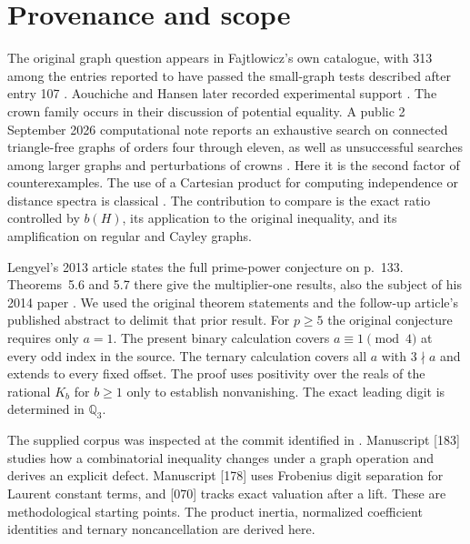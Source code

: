 \documentclass[11pt,a4paper]{article}
\begin{document}
\section{Provenance and scope}
The original graph question appears in Fajtlowicz's own catalogue, with
313 among the entries reported to have passed the small-graph tests
described after entry 107 \cite{fajt313}. Aouchiche and Hansen later
recorded experimental support \cite[Conj.~7.14]{ah313}.
The crown family occurs in their discussion of potential equality. A public
2 September 2026 computational note reports an exhaustive search on connected
triangle-free graphs of orders four through eleven, as well as unsuccessful searches
among larger graphs and perturbations of crowns \cite{village}.
Here it is the second factor of counterexamples. The use of a
Cartesian product for computing independence or distance spectra is
classical \cite{ikr313,indulal313,catral}. The contribution to compare
is the exact ratio controlled by $b(H)$, its application to the
original inequality, and its amplification on regular and Cayley graphs.

Lengyel's 2013 article states the full prime-power conjecture on p.~133.
Theorems~5.6 and 5.7 there give the multiplier-one results, also the subject
of his 2014 paper \cite{len13,len14}. We used the original theorem
statements and the follow-up article's published abstract to delimit
that prior result. For $p\ge5$ the original conjecture requires only
$a=1$. The present binary calculation covers $a\equiv1\pmod4$ at every
odd index in the source. The ternary calculation covers all $a$ with
$3\nmid a$ and extends to every fixed offset. The proof uses positivity
over the reals of the rational $K_b$ for $b\ge1$ only to establish
nonvanishing. The exact leading digit is determined in $\mathbb Q_3$.

The supplied corpus was inspected at the commit identified in
\cite{vmrc}. Manuscript [183] studies how a combinatorial inequality
changes under a graph operation and derives an explicit defect.
Manuscript [178] uses Frobenius digit separation for Laurent constant
terms, and [070] tracks exact valuation after a lift. These are
methodological starting points. The product inertia, normalized
coefficient identities and ternary noncancellation are derived here.
\end{document}
